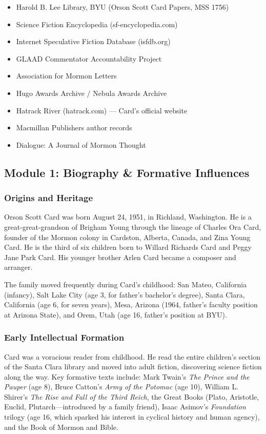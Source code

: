 \documentclass[11pt,letterpaper]{article}
\begin{document}
\begin{itemize}[leftmargin=2em]
  \item Harold B. Lee Library, BYU (Orson Scott Card Papers, MSS 1756)
  \item Science Fiction Encyclopedia (sf-encyclopedia.com)
  \item Internet Speculative Fiction Database (isfdb.org)
  \item GLAAD Commentator Accountability Project
  \item Association for Mormon Letters
  \item Hugo Awards Archive / Nebula Awards Archive
  \item Hatrack River (hatrack.com) --- Card's official website
  \item Macmillan Publishers author records
  \item Dialogue: A Journal of Mormon Thought
\end{itemize}

\subsection{Module 1: Biography \& Formative Influences}

\subsubsection{Origins and Heritage}

Orson Scott Card was born August 24, 1951, in Richland, Washington. He is a great-great-grandson of Brigham Young through the lineage of Charles Ora Card, founder of the Mormon colony in Cardston, Alberta, Canada, and Zina Young Card. He is the third of six children born to Willard Richards Card and Peggy Jane Park Card. His younger brother Arlen Card became a composer and arranger.

The family moved frequently during Card's childhood: San Mateo, California (infancy), Salt Lake City (age 3, for father's bachelor's degree), Santa Clara, California (age 6, for seven years), Mesa, Arizona (1964, father's faculty position at Arizona State), and Orem, Utah (age 16, father's position at BYU).

\subsubsection{Early Intellectual Formation}

Card was a voracious reader from childhood. He read the entire children's section of the Santa Clara library and moved into adult fiction, discovering science fiction along the way. Key formative texts include: Mark Twain's \textit{The Prince and the Pauper} (age 8), Bruce Catton's \textit{Army of the Potomac} (age 10), William L. Shirer's \textit{The Rise and Fall of the Third Reich}, the Great Books (Plato, Aristotle, Euclid, Plutarch---introduced by a family friend), Isaac Asimov's \textit{Foundation} trilogy (age 16, which sparked his interest in cyclical history and human agency), and the Book of Mormon and Bible.
\end{document}
